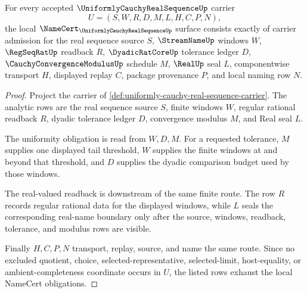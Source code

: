\begin{theorem}
\label{thm:uniformly-cauchy-real-sequence-namecert-obligations}
For every accepted $\UniformlyCauchyRealSequenceUp$ carrier
$$
U=(S,W,R,D,M,L,H,C,P,N),
$$
the local $\NameCert_{\UniformlyCauchyRealSequenceUp}$ surface consists exactly of carrier admission for the real sequence source $S$, $\StreamNameUp$ windows $W$, $\RegSeqRatUp$ readback $R$, $\DyadicRatCoreUp$ tolerance ledger $D$, $\CauchyConvergenceModulusUp$ schedule $M$, $\RealUp$ seal $L$, componentwise transport $H$, displayed replay $C$, package provenance $P$, and local naming row $N$.
\end{theorem}
\begin{proof}
Project the carrier of \autoref{def:uniformly-cauchy-real-sequence-carrier}. The analytic rows are the real sequence source $S$, finite windows $W$, regular rational readback $R$, dyadic tolerance ledger $D$, convergence modulus $M$, and Real seal $L$.

The uniformity obligation is read from $W,D,M$. For a requested tolerance, $M$ supplies one displayed tail threshold, $W$ supplies the finite windows at and beyond that threshold, and $D$ supplies the dyadic comparison budget used by those windows.

The real-valued readback is downstream of the same finite route. The row $R$ records regular rational data for the displayed windows, while $L$ seals the corresponding real-name boundary only after the source, windows, readback, tolerance, and modulus rows are visible.

Finally $H,C,P,N$ transport, replay, source, and name the same route. Since no excluded quotient, choice, selected-representative, selected-limit, host-equality, or ambient-completeness coordinate occurs in $U$, the listed rows exhaust the local NameCert obligations.
\end{proof}

